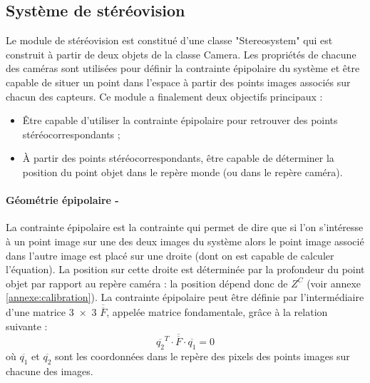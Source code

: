 \documentclass[a4paper, 11pt]{article}
\begin{document}
	\subsection{Système de stéréovision}
		Le module de stéréovision est constitué d'une classe "Stereosystem" qui est construit à partir de deux objets de la classe Camera. Les propriétés de chacune des caméras sont utilisées pour définir la contrainte épipolaire du système et être capable de situer un point dans l'espace à partir des points images associés sur chacun des capteurs. Ce module a finalement deux objectifs principaux :
		\begin{itemize}
			\item \^Etre capable d'utiliser la contrainte épipolaire pour retrouver des points stéréocorrespondants ;
			\item \`A partir des points stéréocorrespondants, être capable de déterminer la position du point objet dans le repère monde (ou dans le repère caméra).
		\end{itemize}
		\paragraph{Géométrie épipolaire -}
			La contrainte épipolaire est la contrainte qui permet de dire que si l'on s'intéresse à un point image sur une des deux images du système alors le point image associé dans l'autre image est placé sur une droite (dont on est capable de calculer l'équation). La position sur cette droite est déterminée par la profondeur du point objet par rapport au repère caméra : la position dépend donc de $Z^C$ (voir annexe \ref{annexe:calibration}). La contrainte épipolaire peut être définie par l'intermédiaire d'une matrice \num{3x3} $\overline{\overline{F}}$, appelée matrice fondamentale, grâce à la relation suivante :
			\begin{equation}
				\overline{q_2}^T \cdot \overline{\overline{F}} \cdot \overline{q_1} = 0
			\end{equation}
			où $\overline{q_1}$ et $\overline{q_2}$ sont les coordonnées dans le repère des pixels des points images sur chacune des images.
\end{document}
